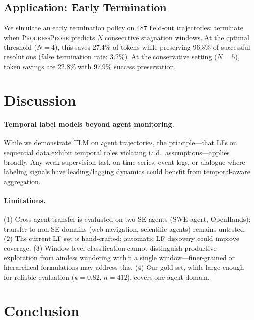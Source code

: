 \documentclass[11pt,a4paper]{article}
\newcommand{\ours}{\textsc{ProgressProbe}}
\newcommand{\tlm}{\textsc{TLM}}
\begin{document}
\subsection{Application: Early Termination}
\label{sec:early-term}

We simulate an early termination policy on 487 held-out trajectories: terminate when \ours{} predicts $N$ consecutive stagnation windows. At the optimal threshold ($N{=}4$), this saves 27.4\% of tokens while preserving 96.8\% of successful resolutions (false termination rate: 3.2\%). At the conservative setting ($N{=}5$), token savings are 22.8\% with 97.9\% success preservation.

\section{Discussion}
\label{sec:discussion}

\paragraph{Temporal label models beyond agent monitoring.}
While we demonstrate \tlm{} on agent trajectories, the principle---that LFs on sequential data exhibit temporal roles violating i.i.d.\ assumptions---applies broadly. Any weak supervision task on time series, event logs, or dialogue where labeling signals have leading/lagging dynamics could benefit from temporal-aware aggregation.

\paragraph{Limitations.}
(1) Cross-agent transfer is evaluated on two SE agents (SWE-agent, OpenHands); transfer to non-SE domains (web navigation, scientific agents) remains untested. (2) The current LF set is hand-crafted; automatic LF discovery could improve coverage. (3) Window-level classification cannot distinguish productive exploration from aimless wandering within a single window---finer-grained or hierarchical formulations may address this. (4) Our gold set, while large enough for reliable evaluation ($\kappa{=}0.82$, $n{=}412$), covers one agent domain.

\section{Conclusion}
\label{sec:conclusion}
\end{document}
